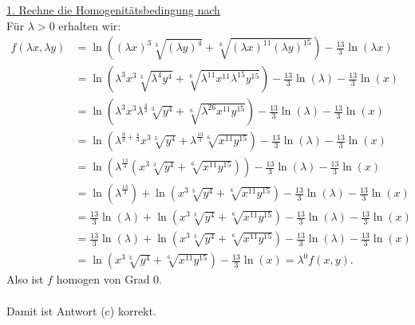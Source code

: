 \underline{1. Rechne die Homogenitätsbedingung nach}\\
Für $ \lambda >0  $ erhalten wir:
\begin{align*}
	f(\lambda x, \lambda y)
	&=
	\ln\left(
	(\lambda x)^3 \sqrt[3]{(\lambda y)^4}
	+
	\sqrt[6]{(\lambda x)^{11} (\lambda y)^{15}}
	\right)
	-
	\frac{13}{3} \ln(\lambda x)\\
	&=
	\ln\left(
	\lambda^3 x^3 \sqrt[3]{\lambda^4 y^4}
	+
	\sqrt[6]{\lambda^{11} x^{11} \lambda^{15} y^{15}}
	\right)
	-
	\frac{13}{3} \ln(\lambda) - \frac{13}{3 }\ln(x)\\
	&=
	\ln\left(
	\lambda^3 x^3 \lambda^{\frac{4}{3}} \sqrt[3]{ y^4}
	+
	\sqrt[6]{\lambda^{26} x^{11}  y^{15}}
	\right)
	-
	\frac{13}{3} \ln(\lambda) - \frac{13}{3 }\ln(x)\\
	&=
	\ln\left(
	\lambda^{\frac{9}{3} + \frac{4}{3}} x^3  \sqrt[3]{ y^4}
	+
	\lambda^{\frac{13}{3}}
	\sqrt[6]{x^{11}  y^{15}}
	\right)
	-
	\frac{13}{3} \ln(\lambda) - \frac{13}{3 }\ln(x)\\
	&=
	\ln\left(
	\lambda^{\frac{13}{3} } \left(
	 x^3  \sqrt[3]{ y^4}
	+
	\sqrt[6]{x^{11}  y^{15}}
	\right)
	\right)
	-
	\frac{13}{3} \ln(\lambda) - \frac{13}{3 }\ln(x)\\
	&=
	\ln\left(
	\lambda^{\frac{13}{3} }\right) + \ln  \left(
	x^3  \sqrt[3]{ y^4}
	+
	\sqrt[6]{x^{11}  y^{15}}
	\right)
	-
	\frac{13}{3} \ln(\lambda) - \frac{13}{3 }\ln(x)\\
	&=
	\frac{13}{3} \ln\left(
	\lambda\right) + \ln  \left(
	x^3  \sqrt[3]{ y^4}
	+
	\sqrt[6]{x^{11}  y^{15}}
	\right)
	-
	\frac{13}{3} \ln(\lambda) - \frac{13}{3 }\ln(x)\\
	&=
	\frac{13}{3} \ln\left(
	\lambda\right) + \ln  \left(
	x^3  \sqrt[3]{ y^4}
	+
	\sqrt[6]{x^{11}  y^{15}}
	\right)
	-
	\frac{13}{3} \ln(\lambda) - \frac{13}{3 }\ln(x)\\
	&=
	\ln  \left(
	x^3  \sqrt[3]{ y^4}
	+
	\sqrt[6]{x^{11}  y^{15}}
	\right)
	-
	\frac{13}{3 }\ln(x)
	= \lambda^0 f(x,y).
\end{align*}
Also ist $ f $ homogen von Grad $ 0 $.\\
\\
Damit ist Antwort (c) korrekt.

\newpage

